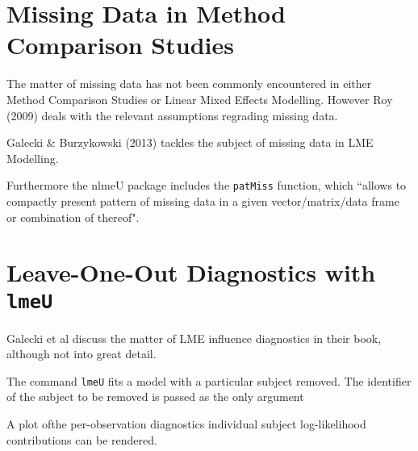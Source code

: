\documentclass[12pt, a4paper]{article}
\begin{document}
\section{Missing Data in Method Comparison Studies}

The matter of missing data has not been commonly encountered in either Method Comparison Studies or Linear Mixed Effects Modelling. However Roy (2009) deals with the relevant assumptions regrading missing data.

Galecki \& Burzykowski (2013) tackles the subject of missing data in LME Modelling.

Furthermore the nlmeU package includes the \texttt{patMiss} function, which ``allows to compactly present pattern of missing data in a given vector/matrix/data
frame or combination of thereof".


\section{Leave-One-Out Diagnostics with \texttt{lmeU}}
Galecki et al discuss the matter of LME influence diagnostics in their book, although not into great detail.


The command \texttt{lmeU} fits a model with a particular subject removed. The identifier of the subject to be removed is passed as the only argument

A plot ofthe per-observation diagnostics individual subject log-likelihood contributions can be rendered.



\end{document}
